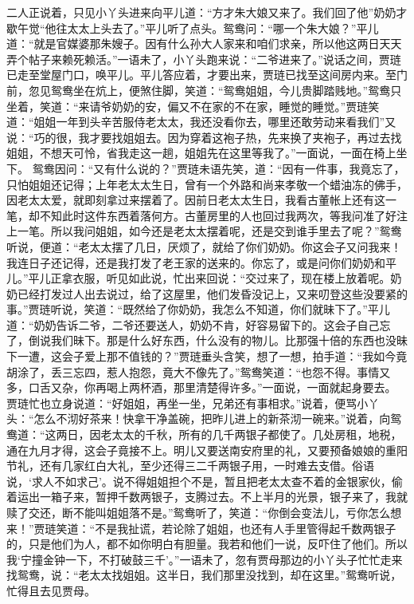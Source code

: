 \documentclass[12pt,oneside]{book}
\begin{document}
二人正说着，只见小丫头进来向平儿道：“方才朱大娘又来了。我们回了他”奶奶才歇午觉“他往太太上头去了。”平儿听了点头。鸳鸯问：“哪一个朱大娘？”平儿道：“就是官媒婆那朱嫂子。因有什么孙大人家来和咱们求亲，所以他这两日天天弄个帖子来赖死赖活。”一语未了，小丫头跑来说：“二爷进来了。”说话之间，贾琏已走至堂屋门口，唤平儿。平儿答应着，才要出来，贾琏已找至这间房内来。至门前，忽见鸳鸯坐在炕上，便煞住脚，笑道：“鸳鸯姐姐，今儿贵脚踏贱地。”鸳鸯只坐着，笑道：“来请爷奶奶的安，偏又不在家的不在家，睡觉的睡觉。”贾琏笑道：“姐姐一年到头辛苦服侍老太太，我还没看你去，哪里还敢劳动来看我们”又说：“巧的很，我才要找姐姐去。因为穿着这袍子热，先来换了夹袍子，再过去找姐姐，不想天可怜，省我走这一趟，姐姐先在这里等我了。”一面说，一面在椅上坐下。
鸳鸯因问：“又有什么说的？”贾琏未语先笑，道：“因有一件事，我竟忘了，只怕姐姐还记得；上年老太太生日，曾有一个外路和尚来孝敬一个蜡油冻的佛手，因老太太爱，就即刻拿过来摆着了。因前日老太太生日，我看古董帐上还有这一笔，却不知此时这件东西着落何方。古董房里的人也回过我两次，等我问准了好注上一笔。所以我问姐姐，如今还是老太太摆着呢，还是交到谁手里去了呢？”鸳鸯听说，便道：“老太太摆了几日，厌烦了，就给了你们奶奶。你这会子又问我来！我连日子还记得，还是我打发了老王家的送来的。你忘了，或是问你们奶奶和平儿。”平儿正拿衣服，听见如此说，忙出来回说：“交过来了，现在楼上放着呢。奶奶已经打发过人出去说过，给了这屋里，他们发昏没记上，又来叨登这些没要紧的事。”贾琏听说，笑道：“既然给了你奶奶，我怎么不知道，你们就昧下了。”平儿道：“奶奶告诉二爷，二爷还要送人，奶奶不肯，好容易留下的。这会子自己忘了，倒说我们昧下。那是什么好东西，什么没有的物儿。比那强十倍的东西也没昧下一遭，这会子爱上那不值钱的？”贾琏垂头含笑，想了一想，拍手道：“我如今竟胡涂了，丢三忘四，惹人抱怨，竟大不像先了。”鸳鸯笑道：“也怨不得。事情又多，口舌又杂，你再喝上两杯酒，那里清楚得许多。”一面说，一面就起身要去。
贾琏忙也立身说道：“好姐姐，再坐一坐，兄弟还有事相求。”说着，便骂小丫头：“怎么不沏好茶来！快拿干净盖碗，把昨儿进上的新茶沏一碗来。”说着，向鸳鸯道：“这两日，因老太太的千秋，所有的几千两银子都使了。几处房租，地税，通在九月才得，这会子竟接不上。明儿又要送南安府里的礼，又要预备娘娘的重阳节礼，还有几家红白大礼，至少还得三二千两银子用，一时难去支借。俗语说，‘求人不如求己’。说不得姐姐担个不是，暂且把老太太查不着的金银家伙，偷着运出一箱子来，暂押千数两银子，支腾过去。不上半月的光景，银子来了，我就赎了交还，断不能叫姐姐落不是。”鸳鸯听了，笑道：“你倒会变法儿，亏你怎么想来！”贾琏笑道：“不是我扯谎，若论除了姐姐，也还有人手里管得起千数两银子的，只是他们为人，都不如你明白有胆量。我若和他们一说，反吓住了他们。所以我‘宁撞金钟一下，不打破鼓三千’。”一语未了，忽有贾母那边的小丫头子忙忙走来找鸳鸯，说：“老太太找姐姐。这半日，我们那里没找到，却在这里。”鸳鸯听说，忙得且去见贾母。
\end{document}
